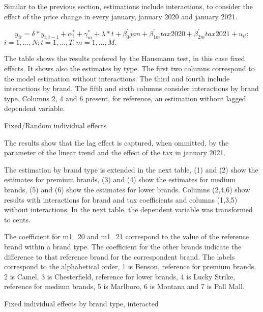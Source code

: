 \documentclass[]{article}
\begin{document}
Similar to the previous section, estimations include interactions, to consider the effect of the price change in every january, january 2020 and january 2021.

\begin{equation*} 
	y_{it}  = \delta*y_{i,t-1} +\alpha_{i}^{*} + \gamma_{m}^{*} + \lambda*t + \beta_{0}^{'}jan + \beta_{1m}^{'}tax2020 + \beta_{2m}^{'}tax2021 + u_{it}
	;   \tag{4.4}
\end{equation*}
$i  = 1,\ldots,N;  t=1,\ldots,T; m=1,\ldots,M. $

The table shows the results prefered by the Hausmann test, in this case fixed effects. It shows also the estimates by type. 
The first two columns correspond to the model estimation without interactions. The third and fourth include interactions by brand.
The fifth and sixth columns consider interactions by brand type.
Columns 2, 4 and 6 present, for reference, an estimation without lagged dependent variable. 

	\begin{table}[ht]
		\centering
		\caption{Fixed/Random individual effects \label{tab:dyn_xtreg}} 
		
%
	\end{table}

The results show that the lag effect is captured, when ommitted, by the parameter of the linear trend and the effect of the tax in january 2021.

The estimation by brand type is extended in the next table, (1) and (2) show the estimates for premium brands, (3) and (4) show the estimates for medium brands, (5) and (6) show the estimates for lower brands.  Columns (2,4,6) show results with interactions for brand and tax coefficients and columns (1,3,5) without interactions.
In the next table, the dependent variable was transformed to cents.

The coefficient for m1\_20 and m1\_21 correspond to the value of the reference brand within a brand type.
The coefficient for the other brands indicate the difference to that reference brand for the correspondent brand. The labels correspond to the alphabetical order, 1 is Benson, reference for premium brands, 2 is Camel, 3 is Chesterfield, reference for lower brands, 4 is Lucky Strike, reference for medium brands, 5 is Marlboro, 6 is Montana and 7 is Pall Mall.

\begin{table}[ht]
	\centering
	\caption{Fixed individual effects by brand type, interacted \label{tab:dyn_xtreg_tipo}} 

%
\end{table}
\end{document}
